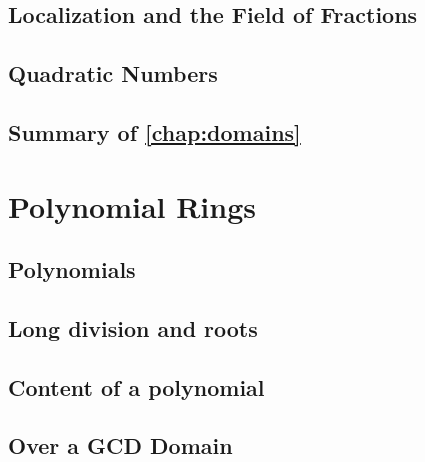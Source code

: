 \documentclass{memoir}
\begin{document}
    \section{Localization and the Field of Fractions}
      \label{sec:localization}
      
      \newpage

    \section{Quadratic Numbers}
      \label{sec:quad-num}
      
      \newpage

    \section*{Summary of \autoref{chap:domains}}
      


  \chapter{Polynomial Rings}
    \label{chap:poly}
    
    \newpage

    \section{Polynomials}
      \label{sec:polynomials}
      
      \newpage

    \section{Long division and roots}
      \label{sec:poly-div-alg}
      
      \newpage

    \section{Content of a polynomial}
      \label{sec:poly-content}
      
      \newpage

    \section{Over a GCD Domain}
      
      \newpage
\end{document}
